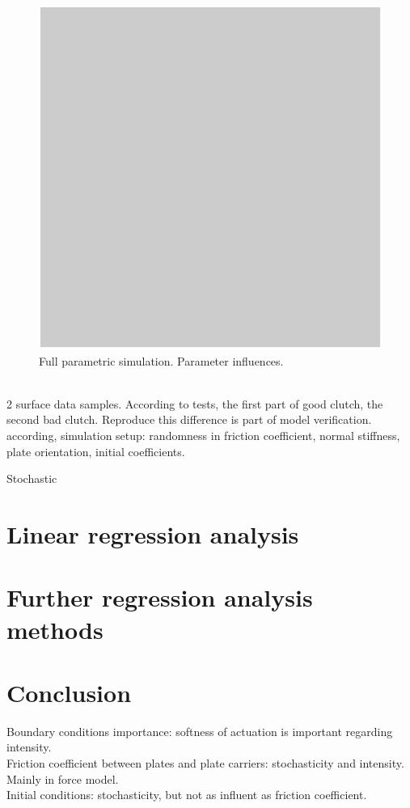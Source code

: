 \documentclass[a4paper,fleqn]{cas-dc}
\begin{document}
\begin{figure}
\centering
\includegraphics[scale=.75]{figs/Fig1.pdf}
\caption{Full parametric simulation. Parameter influences.}
\label{fig:full parametric}
\end{figure}\\

2 surface data samples. According to tests, the first part of good clutch, the second bad clutch. Reproduce this difference is part of model verification. \\

according, simulation setup: 
randomness in friction coefficient, normal stiffness, plate orientation, initial coefficients.

Stochastic 

\section{Linear regression analysis}
\section{Further regression analysis methods}

\section{Conclusion}
Boundary conditions importance: softness of actuation is important regarding intensity. \\
Friction coefficient between plates and plate carriers: stochasticity and intensity. Mainly in force model.  \\
Initial conditions: stochasticity, but not as influent as friction coefficient. \\
\end{document}
